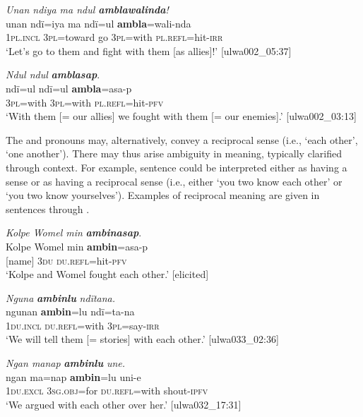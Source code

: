 \ea%
    \label{ex:pron:27}
          \textit{Unan ndiya ma ndul \textbf{amblawalinda}!}\\
\gll    unan    ndï=iya    ma  ndï=ul    \textbf{ambla}=wali-nda\\
    1\textsc{pl.incl}  3\textsc{pl}=toward  go  3\textsc{pl=}with  \textsc{pl.refl}=hit-\textsc{irr}\\
\glt `Let’s go to them and fight with them [as allies]!’ [ulwa002\_05:37]
\z

\ea%
    \label{ex:pron:28}
          \textit{Ndul ndul} \textbf{\textit{amblasap}}.\\
\gll ndï=ul    ndï=ul    \textbf{ambla}=asa-p\\
    3\textsc{pl}=with  3\textsc{pl}=with  \textsc{pl.refl}=hit-\textsc{pfv}\\
\glt `With them [= our allies] we fought with them [= our enemies].’ [ulwa002\_03:13]
\z

The  and   pronouns may, alternatively, convey a reciprocal sense (i.e., ‘each other’, ‘one another’). There may thus arise ambiguity in meaning, typically clarified through context. For example, sentence  could be interpreted either as having a  sense or as having a reciprocal sense (i.e., either ‘you two know each other’ or ‘you two know yourselves’). Examples of reciprocal meaning are given in sentences  through .


\ea%
    \label{ex:pron:29}
          \textit{Kolpe Womel min} \textbf{\textit{ambinasap}}.\\
\gll Kolpe  Womel  min  \textbf{ambin}=asa-p\\
    [name]  [name]  3\textsc{du}  \textsc{du.refl=}hit-\textsc{pfv}\\
\glt `Kolpe and Womel fought each other.’ [elicited]
\z

\ea%
    \label{ex:pron:30}
          \textit{Nguna} \textbf{\textit{ambinlu}} \textit{ndïtana.}\\
\gll    ngunan  \textbf{ambin}=lu    ndï=ta-na\\
    1\textsc{du.incl}  \textsc{du.refl=}with  3\textsc{pl}=say-\textsc{irr}\\
\glt `We will tell them [= stories] with each other.’ [ulwa033\_02:36]
\z

\ea%
    \label{ex:pron:31}
          \textit{Ngan manap} \textbf{\textit{ambinlu}} \textit{une.}\\
\gll    ngan    ma=nap    \textbf{ambin}=lu     uni-e\\
    1\textsc{du.excl}  3\textsc{sg.obj}=for  \textsc{du.refl}=with  shout-\textsc{ipfv}\\
\glt `We argued with each other over her.’ [ulwa032\_17:31]
\z

